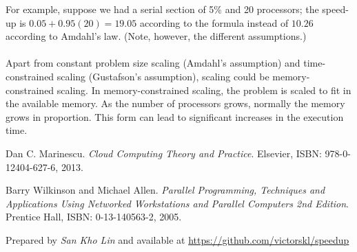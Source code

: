 \documentclass[a4paper]{article}
\begin{document}
\noindent
For example, suppose we had a serial section of 5\% and 20 processors; the speed-up is $0.05 + 0.95(20) = 19.05$ according to the formula instead of $10.26$ according to Amdahl's law. (Note, however, the different assumptions.)
\\
\\
\noindent
Apart from constant problem size scaling (Amdahl's assumption) and time-constrained scaling (Gustafson's assumption), scaling could be memory-constrained scaling. In memory-constrained scaling, the problem is scaled to fit in the available memory. As the number of processors grows, normally the memory grows in proportion. This form can lead to significant increases in the execution time.




\begin{thebibliography}{9}
Dan C. Marinescu. 
\textit{Cloud Computing Theory and Practice}. 
Elsevier, ISBN: 978-0-12404-627-6, 2013.

Barry Wilkinson and Michael Allen. 
\textit{Parallel Programming, Techniques and Applications Using Networked Workstations and Parallel Computers 2nd Edition}. 
Prentice Hall, ISBN: 0-13-140563-2, 2005. 
\end{thebibliography}

\noindent
Prepared by \textit{San Kho Lin} and available at \url{https://github.com/victorskl/speedup}
\end{document}
